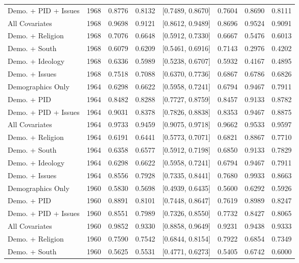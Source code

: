 \begin{longtable}{lrrrlrrr}
  Demo. + PID + Issues & 1968 & 0.8776 & 0.8132 & [0.7489, 0.8670] & 0.7604 & 0.8690 & 0.8111 \\ 
  All Covariates & 1968 & 0.9698 & 0.9121 & [0.8612, 0.9489] & 0.8696 & 0.9524 & 0.9091 \\ 
  Demo. + Religion & 1968 & 0.7076 & 0.6648 & [0.5912, 0.7330] & 0.6667 & 0.5476 & 0.6013 \\ 
  Demo. + South & 1968 & 0.6079 & 0.6209 & [0.5461, 0.6916] & 0.7143 & 0.2976 & 0.4202 \\ 
  Demo. + Ideology & 1968 & 0.6336 & 0.5989 & [0.5238, 0.6707] & 0.5932 & 0.4167 & 0.4895 \\ 
  Demo. + Issues & 1968 & 0.7518 & 0.7088 & [0.6370, 0.7736] & 0.6867 & 0.6786 & 0.6826 \\ 
  Demographics Only & 1964 & 0.6298 & 0.6622 & [0.5958, 0.7241] & 0.6794 & 0.9467 & 0.7911 \\ 
  Demo. + PID & 1964 & 0.8482 & 0.8288 & [0.7727, 0.8759] & 0.8457 & 0.9133 & 0.8782 \\ 
  Demo. + PID + Issues & 1964 & 0.9031 & 0.8378 & [0.7826, 0.8838] & 0.8353 & 0.9467 & 0.8875 \\ 
  All Covariates & 1964 & 0.9733 & 0.9459 & [0.9075, 0.9718] & 0.9662 & 0.9533 & 0.9597 \\ 
  Demo. + Religion & 1964 & 0.6191 & 0.6441 & [0.5773, 0.7071] & 0.6821 & 0.8867 & 0.7710 \\ 
  Demo. + South & 1964 & 0.6358 & 0.6577 & [0.5912, 0.7198] & 0.6850 & 0.9133 & 0.7829 \\ 
  Demo. + Ideology & 1964 & 0.6298 & 0.6622 & [0.5958, 0.7241] & 0.6794 & 0.9467 & 0.7911 \\ 
  Demo. + Issues & 1964 & 0.8556 & 0.7928 & [0.7335, 0.8441] & 0.7680 & 0.9933 & 0.8663 \\ 
  Demographics Only & 1960 & 0.5830 & 0.5698 & [0.4939, 0.6435] & 0.5600 & 0.6292 & 0.5926 \\ 
  Demo. + PID & 1960 & 0.8891 & 0.8101 & [0.7448, 0.8647] & 0.7619 & 0.8989 & 0.8247 \\ 
  Demo. + PID + Issues & 1960 & 0.8551 & 0.7989 & [0.7326, 0.8550] & 0.7732 & 0.8427 & 0.8065 \\ 
  All Covariates & 1960 & 0.9852 & 0.9330 & [0.8858, 0.9649] & 0.9231 & 0.9438 & 0.9333 \\ 
  Demo. + Religion & 1960 & 0.7590 & 0.7542 & [0.6844, 0.8154] & 0.7922 & 0.6854 & 0.7349 \\ 
  Demo. + South & 1960 & 0.5625 & 0.5531 & [0.4771, 0.6273] & 0.5405 & 0.6742 & 0.6000 \\ 

\end{longtable}
